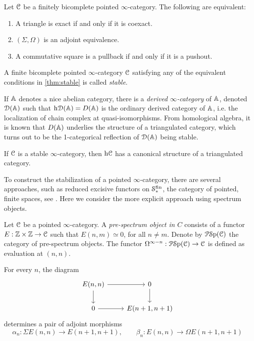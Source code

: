 \documentclass[10pt]{amsart}
\numberwithin{equation}{section}
\begin{document}
\begin{theorem}\label{thm:stable}
  Let $\mathcal{C}$ be a finitely bicomplete pointed $\infty$-category. The following are equivalent:
  \begin{enumerate}
    \item A triangle is exact if and only if it is coexact. 
    \item $(\Sigma,\Omega)$ is an adjoint equivalence.
    \item A commutative square is a pullback if and only if it is a pushout. 
  \end{enumerate}
\end{theorem}
\begin{definition}
  A finite bicomplete pointed $\infty$-category $\mathcal{C}$ satisfying any of the equivalent conditions in \cref{thm:stable} is called \emph{stable}.
\end{definition}
If $\mathbb{A}$ denotes a nice abelian category, there is a \emph{derived $\infty$-category} of $\mathbb{A}$, denoted $\mathcal{D}(\mathbb{A})$ such that $\mathrm{h}\mathcal{D}(\mathbb{A})=D(\mathbb{A})$ is the ordinary derived category of $\mathbb{A}$, i.e. the localization of chain complex at quasi-isomorphisms. From homological algebra, it is known that $D(\mathbb{A})$ underlies the structure of a triangulated category, which turns out to be the 1-categorical reflection of $\mathcal{D}(\mathbb{A})$ being stable. 
\begin{proposition}
  If $\mathcal{C}$ is a stable $\infty$-category, then $\mathrm{h}\mathcal{C}$ has a canonical structure of a triangulated category. 
\end{proposition}To construct the stabilization of a pointed $\infty$-category, there are several approaches, such as reduced excisive functors on $\mathcal{S}^\mathrm{fin}_*$, the category of pointed, finite spaces, see \cite[1.4.2.8]{lurie2017ha}. Here we consider the more explicit approach using spectrum objects.
\begin{definition}
  Let $\mathcal{C}$ be a pointed $\infty$-category. A \emph{pre-spectrum object in $C$} consists of a functor $E:\mathbb{Z}\times\mathbb{Z}\to\mathcal{C}$ such that $E(n,m)\simeq0$, for all $n\neq m$. Denote by $\mathcal{P}\mathcal{S}\mathrm{p}(\mathcal{C})$ the category of pre-spectrum objects. The functor $\Omega^{\infty-n}:\mathcal{P}\mathcal{S}\mathrm{p}(\mathcal{C})\to\mathcal{C}$ is defined as evaluation at $(n,n)$. 
\end{definition}
For every $n$, the diagram \begin{equation}
  \begin{tikzcd}
    E(n,n) \arrow[r]\arrow[d] & 0 \arrow[d] \\
    0 \arrow[r] & E(n+1,n+1) 
  \end{tikzcd}
\end{equation}determines a pair of adjoint morphisms \[\alpha_n:\Sigma E(n,n)\to E(n+1,n+1),\qquad\beta_n:E(n,n)\to\Omega E(n+1,n+1)\]
\end{document}
